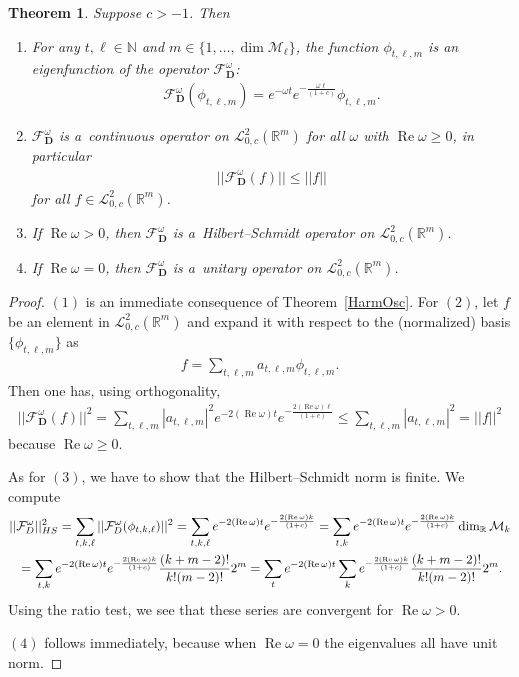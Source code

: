 \documentclass[11pt]{article}
\newtheorem{theorem}{Theorem}
\numberwithin{equation}{section}
\numberwithin{theorem}{section}
\numberwithin{proposition}{section}
\numberwithin{lemma}{section}
\numberwithin{corollary}{section}
\numberwithin{definition}{section}
\numberwithin{example}{section}
\numberwithin{remark}{section}
\numberwithin{note}{section}
\theoremstyle{remark}
\newcommand{\mR}{\mathbb{R}}
\newcommand{\mN}{\mathbb{N}}
\newcommand{\cM}{\mathcal{M}}
\newcommand{\cF}{\mathcal{F}}
\newcommand{\cL}{\mathcal{L}}
\newcommand{\dD}{\textbf{D}}
\def\o{{\omega}}
\begin{document}
\begin{theorem}\label{PropSemigroup}
Suppose $c>-1$.
Then
\begin{enumerate}\itemsep=0pt
\item[$1.$]
For any $t,\ell\in\mN$ and $m\in\{1,\ldots,\dim\cM_{\ell}\}$, the function
$\phi_{t,\ell,m}$ is an eigenfunction of the
operator $\cF_{\dD}^{\o}$:
\begin{gather*}
\cF_{\dD}^{\o}(\phi_{t,\ell,m})=e^{-\o t}e^{-\frac{\o\ell}{(1+c)}}\phi_{t,\ell,m}.
\end{gather*}
\item[$2.$] $\cF_{\dD}^{\o}$ is a~continuous operator on $\cL^{2}_{0,c}(\mR^{m})$ for all $\o$ with $\operatorname{Re}
\o\geq0$, in particular
\begin{gather*}
||\cF_{\dD}^{\o}(f)||\leq||f||
\end{gather*}
for all $f\in\cL^{2}_{0,c}(\mR^{m})$.
\item[$3.$]
If $\operatorname{Re}\o>0$, then $\cF_{\dD}^{\o}$ is a~Hilbert--Schmidt operator on $\cL^{2}_{0,c}(\mR^{m})$.
\item[$4.$]
If $\operatorname{Re}\o=0$, then $\cF_{\dD}^{\o}$ is a~unitary operator on $\cL^{2}_{0,c}(\mR^{m})$.
\end{enumerate}
\end{theorem}

\begin{proof}
$(1)$ is an immediate consequence of Theorem~\ref{HarmOsc}.
For $(2)$, let $f$ be an element in $\cL^{2}_{0,c}(\mR^{m})$ and expand it with respect to the
(normalized) basis $\{\phi_{t,\ell,m}\}$ as
\begin{gather*}
f=\sum_{t,\ell,m}a_{t,\ell,m}\phi_{t,\ell,m}.
\end{gather*}
Then one has, using orthogonality,
\begin{gather*}
||\cF_{\dD}^{\o}(f)||^2 = \sum_{t, \ell, m} |a_{t,\ell,m}|^{2} e^{-2 (\operatorname{Re}{\o}) t} e^{-\frac{2(\operatorname{Re}{\o}) \ell}{(1+c)}}
\leq \sum_{t, \ell, m} |a_{t,\ell,m}|^{2} = ||f||^2
\end{gather*}
because $\operatorname{Re}{\o}\geq0$.

As for $(3)$, we have to show that the Hilbert--Schmidt norm is f\/inite.
We compute
\begin{gather*}
||\cF_{\dD}^{\o}||_{\rm HS}^{2}
= \sum_{t, k, \ell} ||\cF_{\dD}^{\o}(\phi_{t,k,\ell})||^{2}
= \sum_{t, k,\ell} e^{-2 (\operatorname{Re}{\o}) t} e^{-\frac{2 (\operatorname{Re}{\o}) k}{(1+c)}}
= \sum_{t, k} e^{-2 (\operatorname{Re}{\o}) t} e^{-\frac{2 (\operatorname{Re}{\o}) k}{(1+c)}} \dim_{\mR}{\cM_{k}}\\
{} = \sum_{t, k} e^{-2 (\operatorname{Re}{\o}) t} e^{-\frac{2 (\operatorname{Re}{\o}) k}{(1+c)}} \frac{(k + m - 2)!}{k!(m - 2)!}2^{m}
= \sum_{t} e^{-2 (\operatorname{Re}{\o}) t} \sum_{k} e^{-\frac{2 (\operatorname{Re}{\o}) k}{(1+c)}} \frac{(k + m - 2)!}{k!(m - 2)!}2^{m}.
\end{gather*}
Using the ratio test, we see that these series are convergent for $\operatorname{Re}{\o}>0$.

$(4)$ follows immediately, because when $\operatorname{Re}{\o}=0$ the eigenvalues all have unit norm.
\end{proof}
\end{document}
